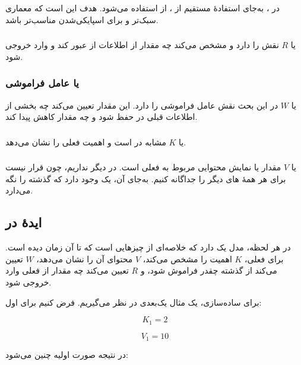 در ، به‌جای استفادهٔ مستقیم از ، از  استفاده می‌شود. هدف این است که معماری سبک‌تر و برای اسپایکی‌شدن مناسب‌تر باشد.

\subsubsection{}
 یا \(R\) نقش  را دارد و مشخص می‌کند چه مقدار از اطلاعات از  عبور کند و وارد خروجی شود.

\subsubsection{ یا عامل فراموشی}
 یا \(W\) در این بحث نقش عامل فراموشی را دارد. این مقدار تعیین می‌کند چه بخشی از اطلاعات قبلی در  حفظ شود و چه مقدار کاهش پیدا کند.

\subsubsection{}
 یا \(K\) مشابه  در  است و اهمیت  فعلی را نشان می‌دهد.

\subsubsection{}
 یا \(V\) مقدار یا نمایش محتوایی مربوط به  فعلی است. در  دیگر  نداریم، چون قرار نیست برای هر  همهٔ های دیگر را جداگانه  کنیم. به‌جای آن، یک  وجود دارد که گذشته را نگه می‌دارد.

\subsection{ایدهٔ  در }
در هر لحظه، مدل یک  دارد که خلاصه‌ای از چیزهایی است که تا آن زمان دیده است. برای  فعلی، \(K\) اهمیت  را مشخص می‌کند، \(V\) محتوای آن را نشان می‌دهد، \(W\) تعیین می‌کند از گذشته چقدر فراموش شود، و \(R\) تعیین می‌کند چه مقدار از  فعلی وارد خروجی شود.

برای ساده‌سازی، یک مثال یک‌بعدی در نظر می‌گیریم. فرض کنیم برای  اول:

\[
K_1 = 2
\]

\[
V_1 = 10
\]

در نتیجه صورت اولیه چنین می‌شود:

